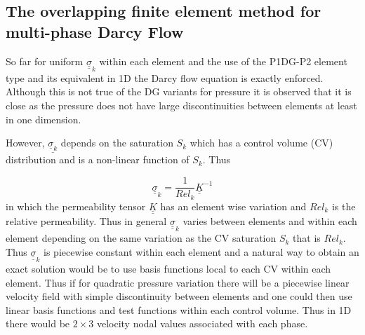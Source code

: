 \subsection{The overlapping finite element method for multi-phase Darcy Flow} 

So far for uniform ${\underline{\underline \sigma}}_k$ within each element and the use of the P1DG-P2 element type 
and its equivalent in 1D the Darcy flow equation is 
exactly enforced. Although this is not true of the DG variants 
for pressure it is observed that it is close 
as the pressure does not have large discontinuities 
between elements at least in one dimension. 

However, ${\underline{\underline \sigma_k}}$ depends on the saturation $S_k$ which has 
a control volume (CV) distribution and is a non-linear function of $S_k$. 
Thus 			

\begin{equation}
{\underline {\underline \sigma}}_k 
= \frac{1}{{Rel}_k} {\underline{\underline K}}^{-1} 	
\end{equation}
in which the permeability tensor 
${\underline{\underline K}}$ has an element wise variation 
and ${Rel}_k$ is the relative permeability. 
Thus in general ${\underline {\underline \sigma}}_k$ varies between elements and within each element 
depending on the same variation as the CV saturation $S_k$ that is $Rel_k$. 
Thus ${\underline {\underline \sigma}}_k$ is piecewise constant 
within each element and a natural 
way to obtain an exact solution would be to use basis functions 
local to each CV within each element. 
Thus if for quadratic pressure variation there will be 
a piecewise 
linear velocity field with simple discontinuity between 
elements and one could then use linear basis functions 
and test functions within each control volume. Thus in 1D 
there would be $2\times 3$ velocity nodal values associated with 
each phase.  

